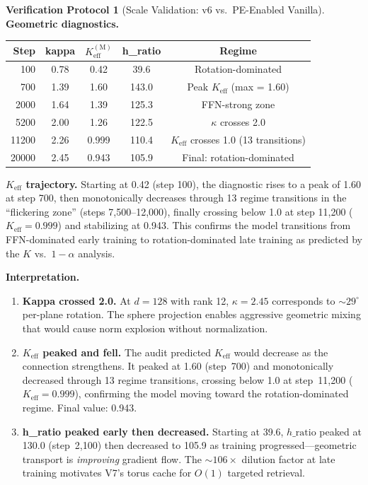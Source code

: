 \documentclass[11pt,a4paper]{article}
\theoremstyle{definition}
\newtheorem{protocol}[theorem]{Verification Protocol}
\theoremstyle{remark}
\begin{document}
\begin{protocol}[Scale Validation: v6 vs.\ PE-Enabled 
Vanilla]
\textbf{Geometric diagnostics.}
\begin{center}
\begin{tabular}{rcccc}
\toprule
\textbf{Step} & \textbf{kappa} & $K_{\mathrm{eff}}^{(\mathrm{M})}$ 
  & \textbf{h\_ratio} & \textbf{Regime} \\
\midrule
100  & 0.78 & 0.42 & 39.6  & Rotation-dominated \\
700  & 1.39 & 1.60 & 143.0 & Peak $K_{\mathrm{eff}}$ (max = 1.60) \\
2000 & 1.64 & 1.39 & 125.3 & FFN-strong zone \\
5200 & 2.00 & 1.26 & 122.5 & $\kappa$ crosses 2.0 \\
11200 & 2.26 & 0.999 & 110.4 & $K_{\mathrm{eff}}$ crosses 1.0 (13 transitions) \\
20000 & 2.45 & 0.943 & 105.9 & Final: rotation-dominated \\
\bottomrule
\end{tabular}
\end{center}

\textbf{$K_{\mathrm{eff}}$ trajectory.} Starting at 0.42 (step 100), 
the diagnostic rises to a peak of 1.60 at step 700, then monotonically 
decreases through 13 regime transitions in the ``flickering zone'' 
(steps 7{,}500--12{,}000), finally crossing below 1.0 at step 11{,}200 
($K_{\mathrm{eff}} = 0.999$) and stabilizing at 0.943. This confirms the 
model transitions from FFN-dominated early training to rotation-dominated 
late training as predicted by the $K$ vs.\ $1-\alpha$ analysis.

\textbf{Interpretation.}
\begin{enumerate}[label=(\roman*)]
    \item \textbf{Kappa crossed 2.0.} At $d = 128$ with rank 12, 
    $\kappa = 2.45$ corresponds to $\sim29^\circ$ per-plane rotation. The 
    sphere projection enables aggressive geometric mixing that 
    would cause norm explosion without normalization.
    
    \item \textbf{$K_{\mathrm{eff}}$ peaked and fell.} The audit 
    predicted $K_{\mathrm{eff}}$ would decrease as the connection 
    strengthens. It peaked at 1.60 (step~700) and monotonically 
    decreased through 13 regime transitions, crossing below 1.0 at 
    step~11{,}200 ($K_{\mathrm{eff}} = 0.999$), confirming the model 
    moving toward the rotation-dominated regime. Final value: 0.943.
    
    \item \textbf{h\_ratio peaked early then decreased.} Starting at 
    39.6, $h\_\mathrm{ratio}$ peaked at 130.0 (step~2{,}100) then 
    decreased to 105.9 as training progressed---geometric transport 
    is \emph{improving} gradient flow. The $\sim106\times$ dilution 
    factor at late training motivates V7's torus cache for $O(1)$ 
    targeted retrieval.
    

\end{enumerate}
\end{protocol}
\end{document}
